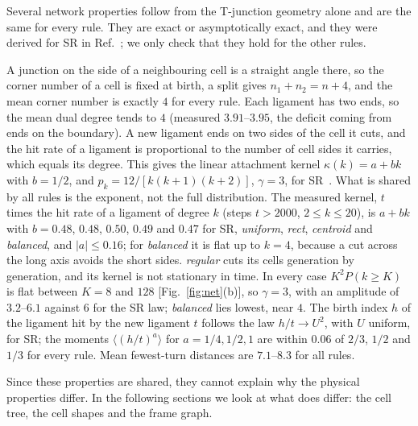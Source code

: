 \documentclass[aps,pre,twocolumn,superscriptaddress,amsmath,amssymb,floatfix]{revtex4-2}
\begin{document}
Several network properties follow from the T-junction geometry alone and are the same for
every rule. They are exact or asymptotically exact, and they were derived for SR in
Ref.~\cite{vazquez2026sr}; we only check that they hold for the other rules.

A junction on the side of a neighbouring cell is a straight angle there, so the corner
number of a cell is fixed at birth, a split gives $n_1+n_2=n+4$, and the mean corner
number is exactly $4$ for every rule. Each ligament has two ends, so the mean dual degree
tends to $4$ (measured $3.91$--$3.95$, the deficit coming from ends on the boundary). A new
ligament ends on two sides of the cell it cuts, and the hit rate of a ligament is
proportional to the number of cell sides it carries, which equals its degree. This gives
the linear attachment kernel $\kappa(k)=a+bk$ with $b=1/2$, and $p_k=12/[k(k+1)(k+2)]$,
$\gamma=3$, for SR~\cite{vazquez2026sr}. What is shared by all rules is the exponent, not
the full distribution. The measured kernel, $t$ times the hit rate of a ligament of degree
$k$ (steps $t>2000$, $2\le k\le20$), is $a+bk$ with $b=0.48$, $0.48$, $0.50$, $0.49$ and
$0.47$ for SR, \emph{uniform}, \emph{rect}, \emph{centroid} and \emph{balanced}, and
$|a|\le0.16$; for \emph{balanced} it is flat up to $k=4$, because a
cut across the long axis avoids the short sides. \emph{regular} cuts its cells generation by
generation, and its kernel is not stationary in time. In every case
$K^2P(k\ge K)$ is flat between $K=8$ and $128$ [Fig.~\ref{fig:net}(b)], so $\gamma=3$, with
an amplitude of $3.2$--$6.1$ against $6$ for the SR law; \emph{balanced} lies lowest, near
$4$. The birth index $h$ of the ligament hit by
the new ligament $t$ follows the law $h/t\to U^2$, with $U$ uniform, for SR; the moments
$\langle(h/t)^a\rangle$ for $a=1/4,1/2,1$ are within $0.06$ of $2/3$, $1/2$ and
$1/3$ for every rule. Mean fewest-turn distances are $7.1$--$8.3$ for all rules.

Since these properties are shared, they cannot explain why the physical properties
differ. In the following sections we look at what does differ: the cell tree, the cell
shapes and the frame graph.
\end{document}
